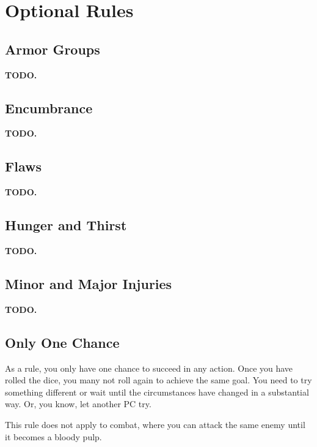 \section{Optional Rules} \label{sec::optionalrules}

\subsection*{Armor Groups} \label{ssec::armorgroups}
    \textbf{TODO.}




\subsection*{Encumbrance} \label{ssec::encumbrance}
    \textbf{TODO.}

\subsection*{Flaws} \label{ssec::flaws}
    \textbf{TODO.}

\subsection*{Hunger and Thirst} \label{ssec::hungerandthirst}
    \textbf{TODO.}

\subsection*{Minor and Major Injuries} \label{ssec::minorandmajorinjuries}
    \textbf{TODO.}

\subsection*{Only One Chance} \label{ssec::onlyonechance}
    As a rule, you only have one chance to succeed in any action.
    Once you have rolled the dice, you many not roll again to achieve the same goal.
    You need to try something different or wait until the circumstances have changed in a substantial way.
    Or, you know, let another PC try.

    This rule does not apply to combat, where you can attack the same enemy until it becomes a bloody pulp.

